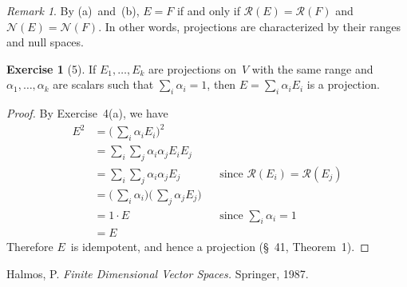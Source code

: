 \documentclass[letterpaper,12pt]{article}
\renewcommand{\ker}{\mathcal{N}}
\newcommand{\range}{\mathcal{R}}
\theoremstyle{definition}
\newtheorem*{exer}{Exercise}
\theoremstyle{remark}
\newtheorem*{rmk}{Remark}
\theoremstyle{direction}
\begin{document}
\begin{rmk}
By (a)~and~(b), \(E=F\) if and only if \(\range(E)=\range(F)\) and \(\ker(E)=\ker(F)\). In other words, projections are characterized by their ranges and null spaces.
\end{rmk}

\begin{exer}[5]
If \(E_1,\ldots,E_k\) are projections on~\(V\) with the same range and \(\alpha_1,\ldots,\alpha_k\) are scalars such that \(\sum_i\alpha_i=1\), then \(E=\sum_i\alpha_i E_i\) is a projection.
\end{exer}
\begin{proof}
By Exercise~4(a), we have
\begin{align*}
E^2&=\bigl(\,\sum_i\alpha_iE_i\bigr)^2&&\\
	&=\sum_i\sum_j\alpha_i\alpha_j E_iE_j&&\\
	&=\sum_i\sum_j\alpha_i\alpha_j E_j&&\text{since \(\range(E_i)=\range(E_j)\)}\\
	&=\bigl(\,\sum_i\alpha_i\bigr)\bigl(\,\sum_j\alpha_jE_j\bigr)&&\\
	&=1\cdot E&&\text{since \(\textstyle\sum_i\alpha_i=1\)}\\
	&=E
\end{align*}
Therefore \(E\)~is idempotent, and hence a projection (\S\ 41, Theorem~1).
\end{proof}

\begin{thebibliography}{0}
 Halmos, P. \textit{Finite Dimensional Vector Spaces.} Springer, 1987.
\end{thebibliography}
\end{document}
